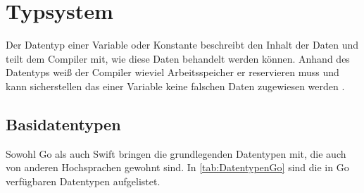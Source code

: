 \chapter{Typsystem}
\label{ch:Typsystem}
Der Datentyp einer Variable oder Konstante beschreibt den Inhalt der Daten und teilt dem Compiler mit, wie diese Daten behandelt werden können. 
Anhand des Datentyps weiß der Compiler wieviel Arbeitsspeicher er reservieren muss und kann sicherstellen das einer Variable keine falschen Daten zugewiesen werden \cite[S.62]{Mathias.2016}.

\section{Basidatentypen}
Sowohl Go als auch Swift bringen die grundlegenden Datentypen mit, die auch von anderen Hochsprachen gewohnt sind.
In \autoref{tab:DatentypenGo} sind die in Go verfügbaren Datentypen aufgelistet.

